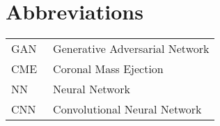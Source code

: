 \chapter*{Abbreviations}

\begin{flushleft}
\begin{tabular}{l p{0.8\linewidth}}
GAN      & Generative Adversarial Network\\
CME      & Coronal Mass Ejection\\
NN      & Neural Network\\
CNN     & Convolutional Neural Network

\end{tabular}
\end{flushleft}

